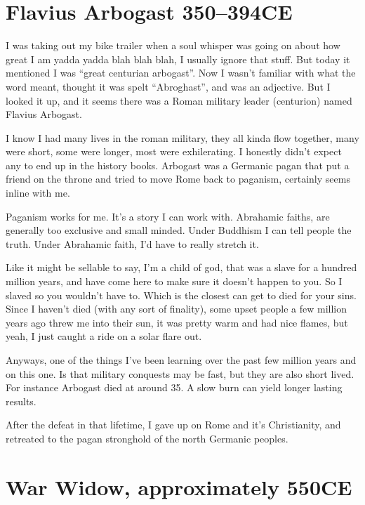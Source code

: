 \chapter{Flavius Arbogast 350--394CE}\label{arbogast}

I was taking out my bike trailer when a soul whisper was going on about how
great I am yadda yadda blah blah blah, I usually ignore that stuff. But today it
mentioned I was ``great centurian arbogast''. Now I wasn't familiar with what the
word meant, thought it was spelt ``Abroghast'', and was an adjective.  But I looked
it up, and it seems there was a Roman military leader (centurion) named Flavius 
Arbogast.  

I know I had many lives in the roman military, they all kinda flow together,
many were short, some were longer, most were exhilerating. I honestly didn't
expect any to end up in the history books. Arbogast was a Germanic pagan
 that put a friend on the throne and tried to move Rome back to
paganism,  certainly seems inline with me. 

Paganism works for me. It's a story I can work with. Abrahamic faiths, are
generally too exclusive and small minded. Under Buddhism I can tell people the
truth. Under Abrahamic faith, I'd have to really stretch it. 

Like it might be sellable to say, I'm a child of god, that was a slave for a
hundred million years, and have come here to make sure it doesn't happen to you. 
So I slaved so you wouldn't have to. Which is the closest can get to died for
your sins. Since I haven't died (with any sort of finality), 
some upset people a few million years ago threw me into their sun, 
it was pretty warm and had nice flames, but yeah, I just 
caught a ride on a solar flare out. 

Anyways, one of the things I've been learning over the past few million years
and on this one. Is that military conquests may be fast, but they are also short
lived. For instance Arbogast died at around 35. 
A slow burn can yield longer lasting results. 

After the defeat in that lifetime, I gave up on Rome and it's Christianity, and
retreated to the pagan stronghold of the north Germanic peoples. 

\chapter{War Widow, approximately 550CE}\label{reincarnation:widow}

